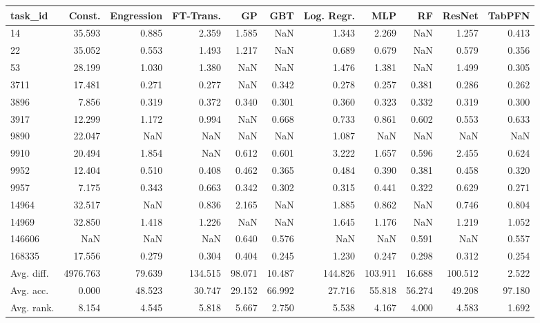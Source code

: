 \begin{tabular}{lrrrrrrrrrr}
\toprule
task\_id & Const. & Engression & FT-Trans. & GP & GBT & Log. Regr. & MLP & RF & ResNet & TabPFN \\
\midrule
14 & 35.593 & 0.885 & 2.359 & 1.585 & NaN & 1.343 & 2.269 & NaN & 1.257 & 0.413 \\
22 & 35.052 & 0.553 & 1.493 & 1.217 & NaN & 0.689 & 0.679 & NaN & 0.579 & 0.356 \\
53 & 28.199 & 1.030 & 1.380 & NaN & NaN & 1.476 & 1.381 & NaN & 1.499 & 0.305 \\
3711 & 17.481 & 0.271 & 0.277 & NaN & 0.342 & 0.278 & 0.257 & 0.381 & 0.286 & 0.262 \\
3896 & 7.856 & 0.319 & 0.372 & 0.340 & 0.301 & 0.360 & 0.323 & 0.332 & 0.319 & 0.300 \\
3917 & 12.299 & 1.172 & 0.994 & NaN & 0.668 & 0.733 & 0.861 & 0.602 & 0.553 & 0.633 \\
9890 & 22.047 & NaN & NaN & NaN & NaN & 1.087 & NaN & NaN & NaN & NaN \\
9910 & 20.494 & 1.854 & NaN & 0.612 & 0.601 & 3.222 & 1.657 & 0.596 & 2.455 & 0.624 \\
9952 & 12.404 & 0.510 & 0.408 & 0.462 & 0.365 & 0.484 & 0.390 & 0.381 & 0.458 & 0.320 \\
9957 & 7.175 & 0.343 & 0.663 & 0.342 & 0.302 & 0.315 & 0.441 & 0.322 & 0.629 & 0.271 \\
14964 & 32.517 & NaN & 0.836 & 2.165 & NaN & 1.885 & 0.862 & NaN & 0.746 & 0.804 \\
14969 & 32.850 & 1.418 & 1.226 & NaN & NaN & 1.645 & 1.176 & NaN & 1.219 & 1.052 \\
146606 & NaN & NaN & NaN & 0.640 & 0.576 & NaN & NaN & 0.591 & NaN & 0.557 \\
168335 & 17.556 & 0.279 & 0.304 & 0.404 & 0.245 & 1.230 & 0.247 & 0.298 & 0.312 & 0.254 \\
Avg. diff. & 4976.763 & 79.639 & 134.515 & 98.071 & 10.487 & 144.826 & 103.911 & 16.688 & 100.512 & 2.522 \\
Avg. acc. & 0.000 & 48.523 & 30.747 & 29.152 & 66.992 & 27.716 & 55.818 & 56.274 & 49.208 & 97.180 \\
Avg. rank. & 8.154 & 4.545 & 5.818 & 5.667 & 2.750 & 5.538 & 4.167 & 4.000 & 4.583 & 1.692 \\
\bottomrule
\end{tabular}

